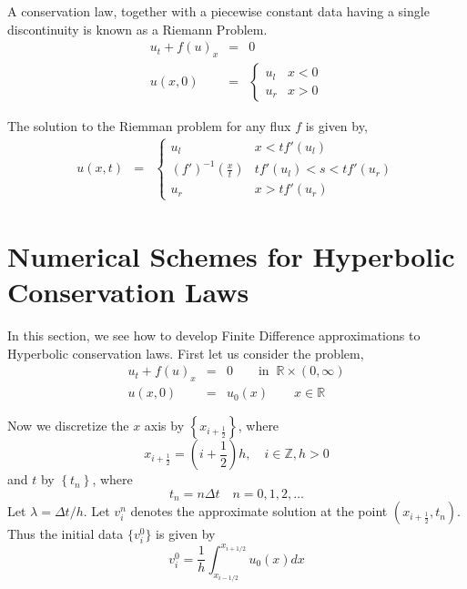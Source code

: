 \noindent
A conservation law, together with a piecewise constant data having a single discontinuity is known as a Riemann Problem.
\begin{eqnarray}
	u_t + f(u)_x &=& 0 \\
	u(x,0) &=& \left\{ 
		\begin{array}{ll}
			u_l  & x < 0 \\
			u_r & x > 0
		\end{array} 
		\right.
\end{eqnarray}

\noindent
The solution to the Riemman problem for any flux $f$ is given by\cite{leve},
\begin{eqnarray}
	u(x,t) &=& \left\{ 
	\begin{array}{ll}
	u_l  & x < tf'(u_l) \\
	(f')^{-1}\left(\frac{x}{t}\right) & tf'(u_l) < s < tf'(u_r)\\
	u_r & x > tf'(u_r)
	\end{array} 
	\right.
\end{eqnarray}

\section{Numerical Schemes for Hyperbolic Conservation Laws}
In this section, we see how to develop Finite Difference approximations to Hyperbolic conservation laws. First let us consider the problem,
\begin{eqnarray}
	u_t + f(u)_x &=& 0 \qquad \text{in} \;\; \mathbb{R} \times (0,\infty)\label{eq:28}\\
	u(x,0) &=& u_0(x) \qquad x \in \mathbb{R}\label{eq:29}
\end{eqnarray}

\noindent
Now we discretize the $x$ axis by $\left\{x_{i+\frac{1}{2}}\right\}$, where
\begin{equation}
	x_{i+\frac{1}{2}} = \left(i + \frac{1}{2}\right) h, \quad i \in \mathbb{Z}, h > 0
\end{equation}
and $t$ by $\left\{t_n\right\}$, where
\begin{equation}
	t_n = n \Delta t \quad n = 0,1,2,\dots
\end{equation}
Let $\lambda = \Delta t / h$. Let $v_i^n$ denotes the approximate solution at the point $\left(x_{i+\frac{1}{2}}, t_n\right)$. Thus the initial data $\{v_i^0\}$ is given by
\begin{equation}
	v_i^0 = \frac{1}{h} \int_{x_{i-1/2}}^{x_{i+1/2}} u_0(x) dx
\end{equation}

